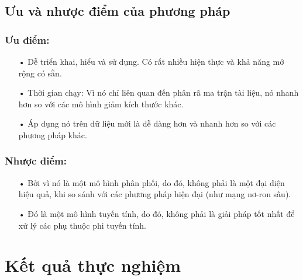 \documentclass[a4paper,11pt]{report}
\begin{document}
\section{Ưu và nhược điểm của phương pháp}
\subsection{Ưu điểm:}
\begin{itemize}
\item[•] Dễ triển khai, hiểu và sử dụng. Có rất nhiều hiện thực và khả năng mở rộng có sẵn.
\item[•] Thời gian chạy: Vì nó chỉ liên quan đến phân rã ma trận tài liệu, nó nhanh hơn so với các mô hình giảm kích thước khác.
\item[•] Áp dụng nó trên dữ liệu mới là dễ dàng hơn và nhanh hơn so với các phương pháp khác.
\end{itemize}
\subsection{Nhược điểm:}
\begin{itemize}
\item[•] Bởi vì nó là một mô hình phân phối, do đó, không phải là một đại diện hiệu quả, khi so sánh với các phương pháp hiện đại (như mạng nơ-ron sâu).
\item[•] Đó là một mô hình tuyến tính, do đó, không phải là giải pháp tốt nhất để xử lý các phụ thuộc phi tuyến tính.
\end{itemize}
\chapter{Kết quả thực nghiệm}
\end{document}
